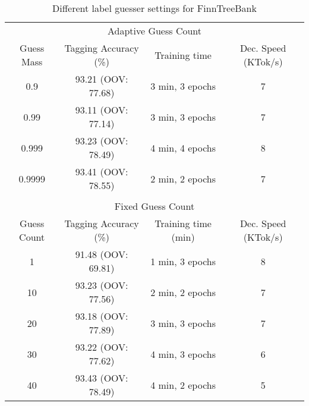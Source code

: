 \begin{table}[htb!]
\begin{center}
\begin{tabular}{cccc}
\multicolumn{4}{c}{Adaptive Guess Count}\\
Guess Mass & Tagging Accuracy (\%) & Training time & Dec. Speed (KTok/s)\\
\hline
0.9        & 93.21 (OOV: 77.68) & 3 min, 3 epochs &   7          \\
0.99       & 93.11 (OOV: 77.14) & 3 min, 3 epochs & 7            \\
0.999      & 93.23 (OOV: 78.49) & 4 min, 4 epochs            & 8            \\
0.9999      & 93.41 (OOV: 78.55) & 2 min, 2 epochs            & 7            \\
           &                  &               &               \\
\multicolumn{4}{c}{Fixed Guess Count}\\
Guess Count & Tagging Accuracy (\%) & Training time (min) & Dec. Speed (KTok/s) \\
\hline
1        & 91.48 (OOV: 69.81)           & 1 min, 3 epochs            & 8            \\
10       & 93.23 (OOV: 77.56)           & 2 min, 2 epochs            & 7            \\
20       & 93.18 (OOV: 77.89)           & 3 min, 3 epochs            & 7            \\
30       & 93.22 (OOV: 77.62)           & 4 min, 3 epochs            & 6            \\
40       & 93.43 (OOV: 78.49)           & 4 min, 2 epochs            & 5            \\
\end{tabular}
\caption{Different label guesser settings for FinnTreeBank}
\end{center}
\end{table}


